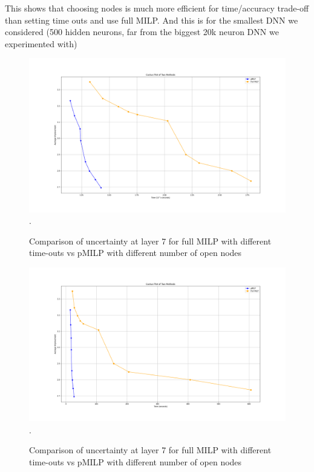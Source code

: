 This shows that choosing nodes is much more efficient for time/accuracy trade-off than setting time outs and use full MILP. And this is for the smallest DNN we considered (500 hidden neurons, far from the biggest 20k neuron DNN we experimented with)
	
	
	\begin{figure}[h]\hspace*{-0.8cm}
			\includegraphics[scale=0.4]{Layer7_comparison.png}.
			\caption{Comparison of uncertainty at layer 7 for full MILP with different time-outs vs pMILP with different number of open nodes}
			\label{fig3}
	\end{figure}
	
	
		\begin{figure}[h]\hspace*{-0.8cm}
		\includegraphics[scale=0.4]{Layer7_comparison_notlog.png}.
		\caption{Comparison of uncertainty at layer 7 for full MILP with different time-outs vs pMILP with different number of open nodes}
		\label{fig5}
	\end{figure}
	
